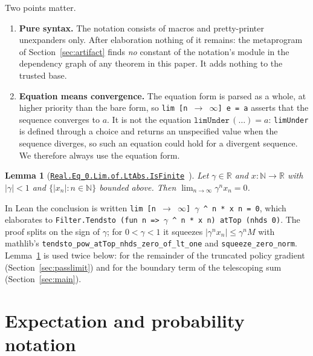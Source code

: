 \documentclass[11pt,a4paper]{article}
\newcommand{\lmod}[1]{\href{http://www.lemma.cn/lean/?module=#1}{\nolinkurl{#1}}}
\newtheorem{lemma}[theorem]{Lemma}
\newcommand{\R}{\mathbb{R}}
\newcommand{\N}{\mathbb{N}}
\begin{document}
Two points matter.
\begin{enumerate}[leftmargin=1.6em,itemsep=0.25em]
  \item \textbf{Pure syntax.} The notation consists of macros and pretty-printer unexpanders only.
  After elaboration nothing of it remains: the metaprogram of Section~\ref{sec:artifact} finds \emph{no} constant of the notation's module in the dependency graph of any theorem in this paper.
  It adds nothing to the trusted base.
  \item \textbf{Equation means convergence.} The equation form is parsed as a whole, at higher priority than the bare form, so \texttt{lim [n $\to$ $\infty$] e = a} asserts that the sequence converges to $a$.
  It is not the equation $\mathtt{limUnder}\,(\ldots)=a$: \texttt{limUnder} is defined through a choice and returns an unspecified value when the sequence diverges, so such an equation could hold for a divergent sequence.
  We therefore always use the equation form.
\end{enumerate}

\begin{lemma}[\lmod{Real.Eq_0.Lim.of.LtAbs.IsFinite}~\cite{lemma_lim}]
\label{lem:lim}
Let $\gamma\in\R$ and $x:\N\to\R$ with $|\gamma|<1$ and $\{|x_n|:n\in\N\}$ bounded above.
Then $\displaystyle\lim_{n\to\infty}\gamma^n x_n=0$.
\end{lemma}
In Lean the conclusion is written \texttt{lim [n $\to$ $\infty$] $\gamma$ \^{} n * x n = 0}, which elaborates to \texttt{Filter.Tendsto (fun n => $\gamma$ \^{} n * x n) atTop (nhds 0)}.
The proof splits on the sign of $\gamma$; for $0<\gamma<1$ it squeezes $|\gamma^nx_n|\le\gamma^nM$ with mathlib's \texttt{tendsto\_pow\_atTop\_nhds\_zero\_of\_lt\_one} and \texttt{squeeze\_zero\_norm}.
Lemma~\ref{lem:lim} is used twice below: for the remainder of the truncated policy gradient (Section~\ref{sec:passlimit}) and for the boundary term of the telescoping sum (Section~\ref{sec:main}).

\section{Expectation and probability notation}
\label{sec:notation}
\end{document}
